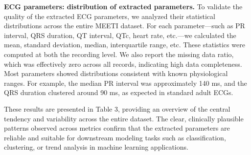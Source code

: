 \documentclass[12pt,letterpaper]{article}
\begin{document}
\textbf{ECG parameters: distribution of extracted parameters.} To validate the quality of the extracted ECG parameters, we analyzed their statistical distributions across the entire MEETI dataset. For each parameter—such as PR interval, QRS duration, QT interval, QTc, heart rate, etc.—we calculated the mean, standard deviation, median, interquartile range, etc. These statistics were computed at both the recording level. We also report the missing data ratio, which was effectively zero across all records, indicating high data completeness. Most parameters showed distributions consistent with known physiological ranges. For example, the median PR interval was approximately 140 ms, and the QRS duration clustered around 90 ms, as expected in standard adult ECGs.

These results are presented in Table 3, providing an overview of the central tendency and variability across the entire dataset. The clear, clinically plausible patterns observed across metrics confirm that the extracted parameters are reliable and suitable for downstream modeling tasks such as classification, clustering, or trend analysis in machine learning applications.
\end{document}

